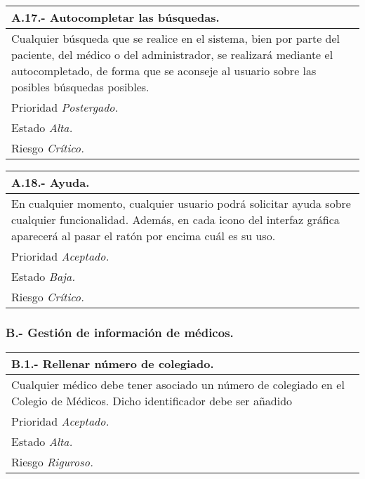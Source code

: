 \documentclass[a4paper,oneside,11pt]{book}
\begin{document}
\begin{center}
\begin{tabulary}{15cm}{|L|}
	\hline
		\bf{A.17.- Autocompletar las búsquedas.} \\
	\hline
		Cualquier búsqueda que se realice en el sistema, bien por parte del paciente, del médico o del administrador, se realizará mediante el autocompletado, de forma que se aconseje al usuario sobre las posibles búsquedas posibles. \\
	\hline
		Prioridad \textit{Postergado.} \\
	\hline
		Estado \textit{Alta.} \\
	\hline
		Riesgo \textit{Crítico.} \\
	\hline
\end{tabulary}
\end{center}

\begin{center}
\begin{tabulary}{15cm}{|L|}
	\hline
		\bf{A.18.- Ayuda.} \\
	\hline
		En cualquier momento, cualquier usuario podrá solicitar ayuda sobre cualquier funcionalidad. Además, en cada icono del interfaz gráfica aparecerá al pasar el ratón por encima cuál es su uso. \\
	\hline
		Prioridad \textit{Aceptado.} \\
	\hline
		Estado \textit{Baja.} \\
	\hline
		Riesgo \textit{Crítico.} \\
	\hline
\end{tabulary}
\end{center}


\subsubsection{B.- Gestión de información de médicos.}

\begin{center}
\begin{tabulary}{15cm}{|L|}
	\hline
		\bf{B.1.- Rellenar número de colegiado.} \\
	\hline
		Cualquier médico debe tener asociado un número de colegiado en el Colegio de Médicos. Dicho identificador debe ser añadido \\
	\hline
		Prioridad \textit{Aceptado.} \\
	\hline
		Estado \textit{Alta.} \\
	\hline
		Riesgo \textit{Riguroso.} \\
	\hline
\end{tabulary}
\end{center}
\end{document}
